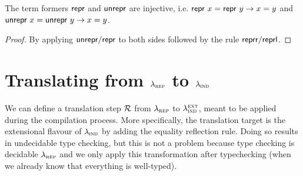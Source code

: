 \begin{lemma}
	The term formers $\textsf{repr}{}$ and $\textsf{unrepr}{}$ are injective, i.e.
	$\textsf{repr}\ x = \textsf{repr}\ y \to x = y$ and $\textsf{unrepr}\ x = \textsf{unrepr}\ y \to x = y$.
	\begin{proof}
				By applying $\textsf{unrepr}/\textsf{repr}$ to both sides
				followed by the rule $\textsf{reprr}/\textsf{reprl}$.
	\end{proof}
\end{lemma}


\section{Translating from $\lambda_{\textsc{rep}}$ to $\lambda_{\textsc{ind}}$}

We can define a translation step $\mathcal{R}$ from $\lambda_{\textsc{rep}}$ to
$\lambda_{\textsc{ind}}^{\textsc{ext}}$, meant to be applied during the compilation process.
More specifically, the translation target is the extensional flavour of
$\lambda_{\textsc{ind}}$ by adding the equality reflection rule. Doing so results in undecidable
type checking, but this is not a problem because type checking is decidable
$\lambda_{\textsc{rep}}$ and we only apply this transformation after typechecking (when we
already know that everything is well-typed).


